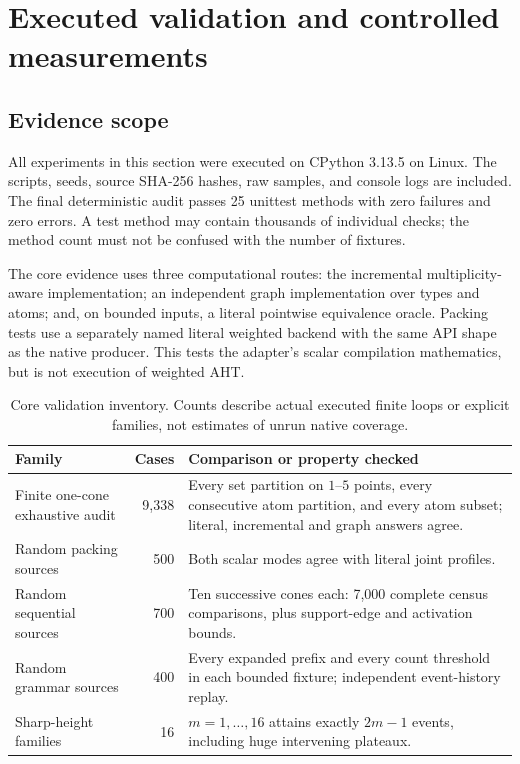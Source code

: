 \section{Executed validation and controlled measurements}
\label{sec:validation}

\subsection{Evidence scope}

All experiments in this section were executed on CPython 3.13.5 on Linux.
The scripts, seeds, source SHA-256 hashes, raw samples, and console logs are
included. The final deterministic audit passes 25 unittest methods with
zero failures and zero errors. A test method may contain thousands of
individual checks; the method count must not be confused with the number
of fixtures.

The core evidence uses three computational routes: the incremental
multiplicity-aware implementation; an independent graph implementation over
types and atoms; and, on bounded inputs, a literal pointwise equivalence
oracle. Packing tests use a separately named literal weighted backend with
the same API shape as the native producer. This tests the adapter's scalar
compilation mathematics, but is not execution of weighted AHT.

\begin{table}[htbp]
\centering\small
\begin{tabularx}{\linewidth}{@{}l r X@{}}
\toprule
Family & Cases & Comparison or property checked\\
\midrule
Finite one-cone exhaustive audit & 9,338 & Every set partition on $1$--$5$ points,
every consecutive atom partition, and every atom subset; literal, incremental
and graph answers agree.\\
Random packing sources & 500 & Both scalar modes agree with literal joint profiles.\\
Random sequential sources & 700 & Ten successive cones each: 7,000 complete
census comparisons, plus support-edge and activation bounds.\\
Random grammar sources & 400 & Every expanded prefix and every count threshold
in each bounded fixture; independent event-history replay.\\
Sharp-height families & 16 & $m=1,\ldots,16$ attains exactly $2m-1$ events,
including huge intervening plateaux.\\
\bottomrule
\end{tabularx}
\caption{Core validation inventory. Counts describe actual executed finite
loops or explicit families, not estimates of unrun native coverage.}
\label{tab:validation}
\end{table}

